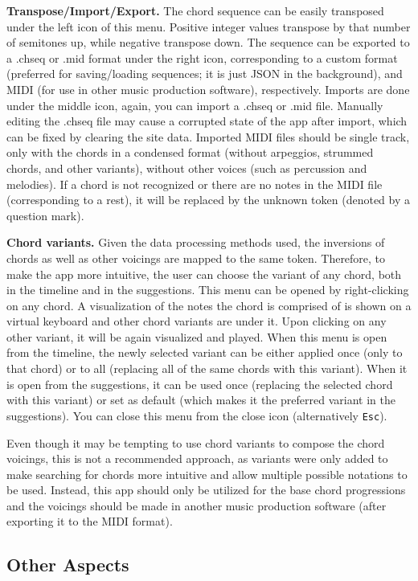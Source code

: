 \documentclass{article}
\begin{document}
\textbf{Transpose/Import/Export.} The chord sequence can be easily transposed under the left icon of this menu. Positive integer values transpose by that number of semitones up, while negative transpose down. The sequence can be exported to a .chseq or .mid format under the right icon, corresponding to a custom format (preferred for saving/loading sequences; it is just JSON in the background), and MIDI (for use in other music production software), respectively. Imports are done under the middle icon, again, you can import a .chseq or .mid file. Manually editing the .chseq file may cause a corrupted state of the app after import, which can be fixed by clearing the site data. Imported MIDI files should be single track, only with the chords in a condensed format (without arpeggios, strummed chords, and other variants), without other voices (such as percussion and melodies). If a chord is not recognized or there are no notes in the MIDI file (corresponding to a rest), it will be replaced by the unknown token (denoted by a question mark).

\textbf{Chord variants.} Given the data processing methods used, the inversions of chords as well as other voicings are mapped to the same token. Therefore, to make the app more intuitive, the user can choose the variant of any chord, both in the timeline and in the suggestions. This menu can be opened by right-clicking on any chord. A visualization of the notes the chord is comprised of is shown on a virtual keyboard and other chord variants are under it. Upon clicking on any other variant, it will be again visualized and played. When this menu is open from the timeline, the newly selected variant can be either applied once (only to that chord) or to all (replacing all of the same chords with this variant). When it is open from the suggestions, it can be used once (replacing the selected chord with this variant) or set as default (which makes it the preferred variant in the suggestions). You can close this menu from the close icon (alternatively \texttt{Esc}).

Even though it may be tempting to use chord variants to compose the chord voicings, this is not a recommended approach, as variants were only added to make searching for chords more intuitive and allow multiple possible notations to be used. Instead, this app should only be utilized for the base chord progressions and the voicings should be made in another music production software (after exporting it to the MIDI format).

\subsection{Other Aspects}
\end{document}

